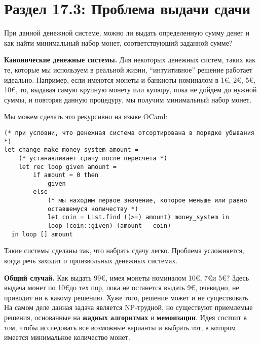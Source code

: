 \section*{Раздел 17.3:  Проблема выдачи сдачи}

\vspace{\baselineskip}
При данной денежной системе, можно ли выдать определенную сумму денег и как найти минимальный набор монет, соответствующий заданной сумме?

\vspace{\baselineskip}
{\bfseries Канонические денежные системы.} Для некоторых денежных систем, таких как те, которые мы используем в реальной жизни, “интуитивное” решение работает идеально. Например, если имеются монеты и банкноты номиналом в 1\euro, 2\euro, 5\euro, 10\euro, то, выдавая самую крупную монету или купюру, пока не дойдем до нужной суммы, и повторяя данную процедуру, мы получим минимальный набор монет.

\vspace{\baselineskip}
Мы можем сделать это рекурсивно на языке OCaml:

\vspace{\baselineskip}
\begin{tcolorbox}
\begin{verbatim}
(* при условии, что денежная система отсортирована в порядке убывания *)
let change_make money_system amount =
	(* устанавливает сдачу после пересчета *)
	let rec loop given amount =
		if amount = 0 then 
			given
		else
			(* мы находим первое значение, которое меньше или равно
			оставшемуся количеству *)
			let coin = List.find ((>=) amount) money_system in
			loop (coin::given) (amount - coin)
  in loop [] amount
\end{verbatim}
\end{tcolorbox}

\vspace{\baselineskip}
Такие системы сделаны так, что набрать сдачу легко. Проблема усложняется, когда речь заходит о произвольных денежных системах.

\vspace{\baselineskip}
{\bfseries Общий случай.} Как выдать 99\euro, имея монеты номиналом 10\euro, 7\euro и 5\euro? Здесь выдача монет по 10\euro до тех пор, пока не останется выдать 9\euro, очевидно, не приводит ни к какому решению. Хуже того, решение может и не существовать. На самом деле данная задача является NP-трудной, но существуют приемлемые решения, основанные на {\bfseries жадных алгоритмах} и {\bfseries мемоизации}. Идея состоит в том, чтобы исследовать все возможные варианты и выбрать тот, в котором имеется минимальное количество монет.


